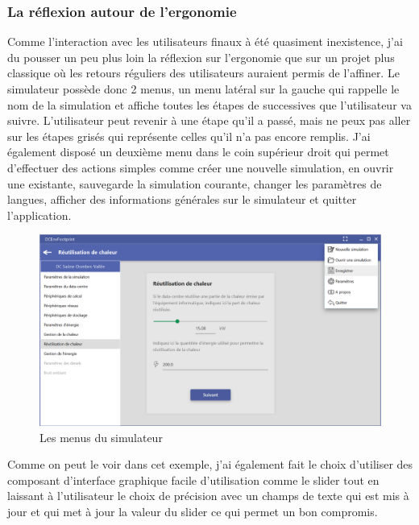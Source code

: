 \subsubsection{La réflexion autour de l'ergonomie}
Comme l'interaction avec les utilisateurs finaux à été quasiment inexistence, j'ai du pousser un peu plus loin la réflexion sur l'ergonomie que sur un projet plus classique où les retours réguliers des utilisateurs auraient permis de l'affiner. Le simulateur possède donc 2 menus, un menu latéral sur la gauche qui rappelle le nom de la simulation et affiche toutes les étapes de successives que l'utilisateur va suivre. L'utilisateur peut revenir à une étape qu'il a passé, mais ne peux pas aller sur les étapes grisés qui représente celles qu'il n'a pas encore remplis. J'ai également disposé un deuxième menu dans le coin supérieur droit qui permet d'effectuer des actions simples comme créer une nouvelle simulation, en ouvrir une existante, sauvegarde la simulation courante, changer les paramètres de  langues, afficher des informations générales sur le simulateur et quitter l'application.

\begin{figure}[h]
	\begin{center}
		\includegraphics[scale=0.40]{partie2/images/ergonomie1.png}
		\caption{Les menus du simulateur}
	\end{center}
\end{figure}

Comme on peut le voir dans cet exemple, j'ai également fait le choix d'utiliser des composant d'interface graphique facile d'utilisation comme le slider tout en laissant à l'utilisateur le choix de précision avec un champs de texte qui est mis à jour et qui met à jour la valeur du slider ce qui permet un bon compromis.

